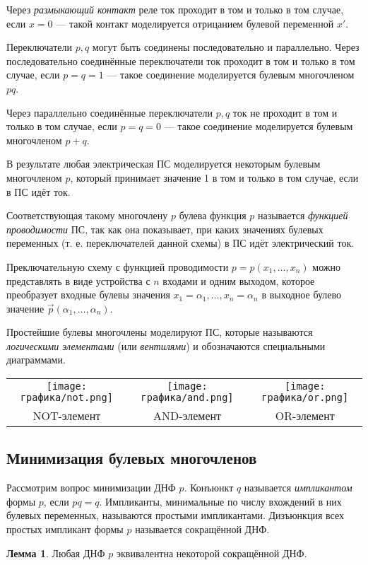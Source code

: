 Через \textit{размыкающий контакт} реле ток проходит в том и только в том случае, если $x = 0$ --- такой контакт моделируется отрицанием булевой переменной $x'$.

Переключатели $p, q$ могут быть соединены последовательно и параллельно. Через последовательно соединённые переключатели ток проходит в том и только в том случае, если $p=q=1$ --- такое соединение моделируется булевым многочленом $pq$.

Через параллельно соединённые переключатели $p,q$ ток не проходит в том и только в том случае, если $p=q=0$ --- такое соединение моделируется булевым многочленом $p+q$.

В результате любая электрическая ПС моделируется некоторым булевым многочленом $p$, который принимает значение 1 в том и только в том случае, если в ПС идёт ток.

Соответствующая такому многочлену $p$ булева функция $p$ называется \textit{функцией проводимости} ПС, так как она показывает, при каких значениях булевых переменных (т. е. переключателей данной схемы) в ПС идёт электрический ток.

Преключательную схему с функцией проводимости $p=p(x_1,\dots,x_n)$ можно представлять в виде устройства с $n$ входами и одним выходом, которое преобразует входные булевы значения $x_1 = \alpha_1, \dots, x_n = \alpha_n$ в выходное булево значение $\vec p(\alpha_1, \dots, \alpha_n)$.

Простейшие булевы многочлены моделируют ПС, которые называются \textit{логическими элементами} (или \textit{вентилями}) и обозначаются специальными диаграммами.

\begin{tabular}{ccc}
    \texttt{[image: графика/not.png]} & \texttt{[image: графика/and.png]} & \texttt{[image: графика/or.png]} \\
    NOT-элемент & AND-элемент & OR-элемент
\end{tabular}
\subsection{Минимизация булевых многочленов}
Рассмотрим вопрос минимизации ДНФ $p$. Конъюнкт $q$ называется \textit{импликантом} формы $p$, если $pq = q$. Импликанты, минимальные по числу вхождений в них булевых переменных, называются $\textit{простыми импликантами}$. Дизъюнкция всех простых импликант формы $p$ называется $\textit{сокращённой ДНФ}$.

\textbf{Лемма 1}. Любая ДНФ $p$ эквивалентна некоторой сокращённой ДНФ.

